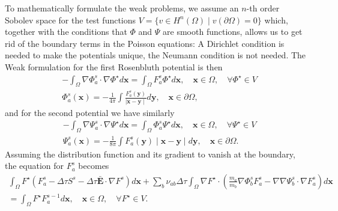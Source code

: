 \documentclass[reprint]{revtex4}
\newcommand{\e}{\mathbf{e}}
\begin{document}
To mathematically formulate the weak problems, we assume an $n$-th order Sobolev space for the test functions $V=\{v\in H^n(\Omega) \mid v(\partial\Omega)=0 \}$ which, together with the conditions that $\Phi$ and $\Psi$ are smooth functions, allows us to get rid of the boundary terms in the Poisson equations: A Dirichlet condition is needed to make the potentials unique, the Neumann condition is not needed. The Weak formulation for the first Rosenbluth potential is then 
\begin{align}
&-\int_{\Omega}\nabla\Phi_a^s\cdot\nabla\Phi^{\star}d\bm{x}=\int_{\Omega}F_a^s\Phi^{\star}d\bm{x}, \quad \bm{x}\in\Omega, \quad \forall \Phi^{\star}\in V\\
&\Phi_a^s(\bm{x})=-\frac{1}{4\pi}\int \frac{F_a^s(\bm{y})}{\mid \bm{x}-\bm{y}\mid}d\bm{y}, \quad \bm{x}\in\partial\Omega,
\end{align}
and for the second potential we have similarly
\begin{align}
&-\int_{\Omega}\nabla\Psi_a^s\cdot\nabla\Psi^{\star}d\bm{x}=\int_{\Omega}\Phi_a^s\Psi^{\star}d\bm{x}, \quad \bm{x}\in\Omega, \quad \forall \Psi^{\star}\in V\\
&\Psi_a^s(\bm{x})=-\frac{1}{8\pi}\int F_a^s(\bm{y})\mid \bm{x}-\bm{y}\mid d\bm{y}, \quad \bm{x}\in\partial\Omega.
\end{align}
Assuming the distribution function and its gradient to vanish at the boundary, the equation for $F_a^s$ becomes
\begin{multline}
\int_{\Omega}F^{\star}\left(F_a^s -\Delta\tau S^s-\Delta\tau\bar{\bm{E}}\cdot\nabla F^s\right)d\bm{x}
+\sum_b\nu_{ab}\Delta\tau\int_{\Omega}\nabla F^{\star}\cdot\left(\frac{m_a}{m_b}\nabla \Phi_b^s F_a^s-\nabla\nabla\Psi_b^s\cdot\nabla F_a^s\right)d\bm{x}\\
=\int_{\Omega}F^{\star}F_a^{s-1}d\bm{x}, \quad \bm{x}\in\Omega, \quad \forall F^{\star}\in V.
\end{multline}

\end{document}
